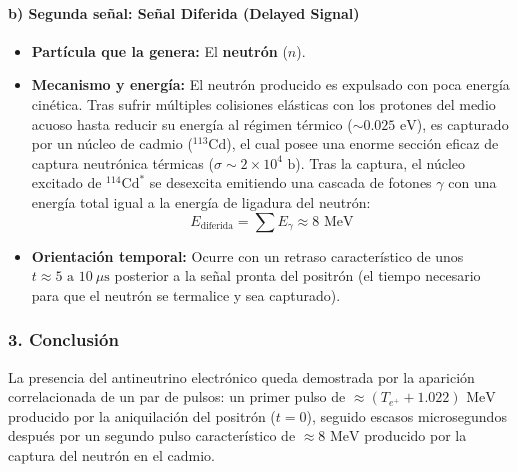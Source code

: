 \begin{problema}
\paragraph{b) Segunda señal: Señal Diferida (Delayed Signal)}
\begin{itemize}
    \item \textbf{Partícula que la genera:} El \textbf{neutrón} ($n$).
    \item \textbf{Mecanismo y energía:} El neutrón producido es expulsado con poca energía cinética. Tras sufrir múltiples colisiones elásticas con los protones del medio acuoso hasta reducir su energía al régimen térmico ($\sim 0.025\text{ eV}$), es capturado por un núcleo de cadmio ($^{113}\text{Cd}$), el cual posee una enorme sección eficaz de captura neutrónica térmicas ($\sigma \sim 2 \times 10^4\text{ b}$). Tras la captura, el núcleo excitado de $^{114}\text{Cd}^*$ se desexcita emitiendo una cascada de fotones $\gamma$ con una energía total igual a la energía de ligadura del neutrón:
    \begin{equation*}
    E_{\text{diferida}} = \sum E_\gamma \approx 8\text{ MeV}
    \end{equation*}
    \item \textbf{Orientación temporal:} Ocurre con un retraso característico de unos \textbf{$t \approx 5\text{ a } 10\ \mu\text{s}$} posterior a la señal pronta del positrón (el tiempo necesario para que el neutrón se termalice y sea capturado).
\end{itemize}

\subsubsection*{3. Conclusión}
La presencia del antineutrino electrónico queda demostrada por la aparición correlacionada de un par de pulsos: un primer pulso de $\approx (T_{e^+} + 1.022)\text{ MeV}$ producido por la aniquilación del positrón ($t=0$), seguido escasos microsegundos después por un segundo pulso característico de $\approx 8\text{ MeV}$ producido por la captura del neutrón en el cadmio.
\end{problema}
\newpage
